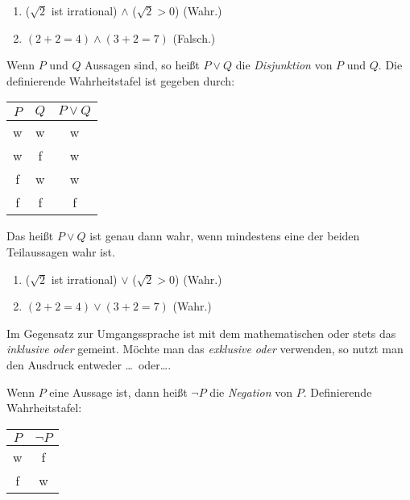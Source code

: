 \begin{frame}
\begin{example}
\begin{enumerate}
\item ($\sqrt{2}$ ist irrational) $\wedge$ ($\sqrt{2} > 0$) (Wahr.)
\item $(2 + 2 = 4) \wedge (3 + 2 = 7)$ (Falsch.)
\end{enumerate}
\end{example}
\end{frame}


\begin{frame}
\begin{mydef}
Wenn $P$ und $Q$ Aussagen sind, so heißt $P \vee Q$ die \textit{Disjunktion}
von $P$ und $Q$.
Die definierende Wahrheitstafel ist gegeben durch:

\begin{table}[H]
\centering
\begin{tabular}{c|c|c}
$P$ & $Q$ & $P \vee Q$ \\ \hline
w   & w   & w \\
w   & f   & w \\
f   & w   & w \\
f   & f   & f
\end{tabular}
\end{table}

Das heißt $P \vee Q$ ist genau dann wahr, wenn mindestens eine der beiden
Teilaussagen wahr ist.
\end{mydef}
\end{frame}


\begin{frame}
\begin{example}
\begin{enumerate}
\item ($\sqrt{2}$ ist irrational) $\vee$ ($\sqrt{2} > 0$) (Wahr.)
\item $(2 + 2 = 4) \vee (3 + 2 = 7)$ (Wahr.)
\end{enumerate}
\end{example}

\begin{remark}
Im Gegensatz zur Umgangssprache ist mit dem mathematischen oder stets das
\textit{inklusive oder} gemeint.
Möchte man das \textit{exklusive oder} verwenden, so nutzt man den Ausdruck
\glqq entweder \ldots\ oder\ldots\grqq.
\end{remark}
\end{frame}


\begin{frame}
\begin{mydef}
Wenn $P$ eine Aussage ist, dann heißt $\neg P$ die \textit{Negation} von $P$.
Definierende Wahrheitstafel:

\begin{table}[H]
\centering
\begin{tabular}{c|c}
$P$ & $\neg P$ \\ \hline
w   & f \\
f   & w
\end{tabular}
\end{table}
\end{mydef}
\end{frame}


